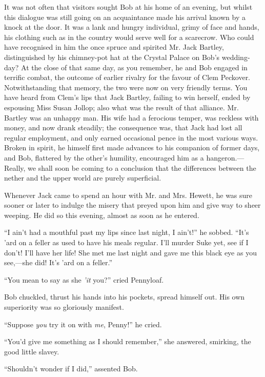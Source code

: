 It was not often that visitors sought Bob at his home of an evening, but
whilst this dialogue was still going on an acquaintance made his arrival
known by a knock at the door. It was a lank and hungry individual, grimy
of face and hands, his clothing such as in the country would serve well
for a {}scarecrow. Who could have recognised in him the once spruce and
spirited Mr. Jack Bartley, distinguished by his chimney-pot hat at the
Crystal Palace on Bob's wedding-day? At the close of that same day, as
you remember, he and Bob engaged in terrific combat, the outcome of
earlier rivalry for the favour of Clem Peckover. Notwithstanding that
memory, the two were now on very friendly terms. You have heard from
Clem's lips that Jack Bartley, failing to win herself, ended by
espousing Miss Susan Jollop; also what was the result of that alliance.
Mr. Bartley was an unhappy man. His wife had a ferocious temper, was
reckless with money, and now drank steadily; the consequence was, that
Jack had lost all regular employment, and only earned occasional pence
in the most various ways. Broken in spirit, he himself first made
advances to his companion of former days, and Bob, flattered by the
other's humility, encouraged him as a hangeron.---Really, we shall soon
be coming to a conclusion that the differences between the {}nether and
the upper world are purely superficial.

Whenever Jack came to spend an hour with Mr. and Mrs. Hewett, he was
sure sooner or later to indulge the misery that preyed upon him and give
way to sheer weeping. He did so this evening, almost as soon as he
entered.

``I ain't had a mouthful past my lips since last night, I ain't!'' he
sobbed. ``It's 'ard on a feller as used to have his meals regular. I'll
murder Suke yet, see if I don't! I'll have her life! She met me last
night and gave me this black eye as you see,---she did! It's 'ard on a
feller.''

``You mean to say as she \emph{'it} you?'' cried Pennyloaf.

Bob chuckled, thrust his hands into his pockets, spread himself out. His
own superiority was so gloriously manifest.

``Suppose \emph{you} try it on with \emph{me}, Penny!'' he cried.

``You'd give me something as I should remember,'' she answered,
smirking, the good little slavey.

{}``Shouldn't wonder if I did,'' assented Bob.

